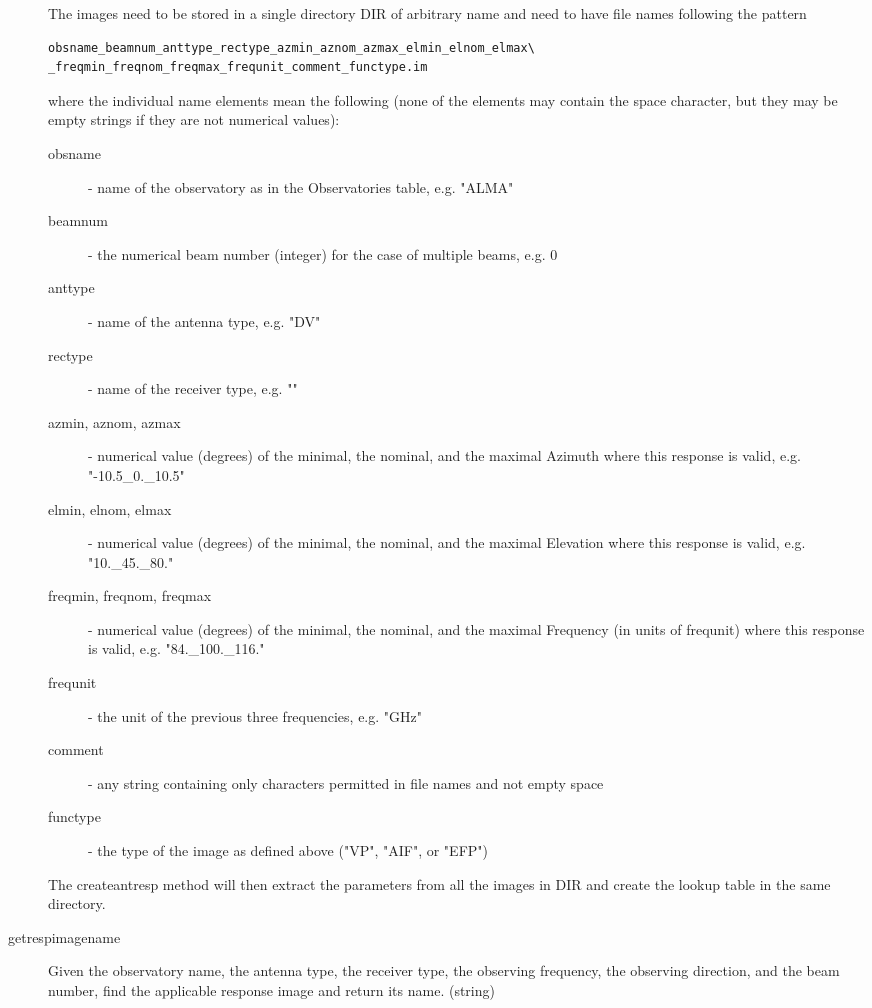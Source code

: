 \documentclass[12pt]{article}
\begin{document}
\begin{description}
The images need to be stored in a single directory DIR of arbitrary name and need to
have file names following the pattern
{\small
\begin{verbatim}
obsname_beamnum_anttype_rectype_azmin_aznom_azmax_elmin_elnom_elmax\
_freqmin_freqnom_freqmax_frequnit_comment_functype.im
\end{verbatim}
}
where the individual name elements mean the following (none of the elements may contain 
the space character, but they may be empty strings if they are not numerical values):
\begin{description}
\item[obsname] - name of the observatory as in the Observatories table, e.g. "ALMA"
\item[beamnum] - the numerical beam number (integer) for the case of multiple beams, e.g. 0
\item[anttype] - name of the antenna type, e.g. "DV"
\item[rectype] - name of the receiver type, e.g. ""
\item[azmin, aznom, azmax] - numerical value (degrees) of the minimal, the nominal, and 
  the maximal Azimuth where this response is valid, e.g. "-10.5\_0.\_10.5"
\item[elmin, elnom, elmax] - numerical value (degrees) of the minimal, the nominal, and 
  the maximal Elevation where this response is valid, e.g. "10.\_45.\_80."
\item[freqmin, freqnom, freqmax] - numerical value (degrees) of the minimal, the nominal, and 
  the maximal Frequency (in units of frequnit) where this response is valid, e.g. "84.\_100.\_116."
\item[frequnit] - the unit of the previous three frequencies, e.g. "GHz"
\item[comment] - any string containing only characters permitted in file names and not empty space
\item[functype] - the type of the image as defined above ("VP", "AIF", or "EFP")
 \end{description}

The createantresp method will then extract the parameters from all the images in DIR
and create the lookup table in the same directory.

  \item[getrespimagename]
    Given the observatory name, the antenna type, the receiver type, the observing frequency, the
    observing direction, and the beam number, find the applicable response image and return its name.
    (string)


\end{description}
\end{document}
